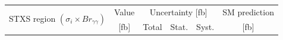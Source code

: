 \begin{table}[!htp]
  \begin{center}
  \small
   \renewcommand{\arraystretch}{1.35}
    \begin{adjustbox}{width={\textwidth},totalheight={\textheight},keepaspectratio}
    \begin{tabular}{l|rlll@{ }|l@{ }}
      \hline \hline
      \multirow{2}{*}{STXS region $(\sigma_i \times Br_{\gamma\gamma})$} & \multicolumn{1}{c}{Value} & \multicolumn{3}{c|}{ Uncertainty [fb]} & \multicolumn{1}{c}{SM prediction} \\
                                                            &  \multicolumn{1}{c}{[fb]}                & Total   & Stat.                & Syst.   & \multicolumn{1}{c}{[fb]}   \\
\hline


\end{tabular}
\end{adjustbox}
\end{center}
\end{table}
